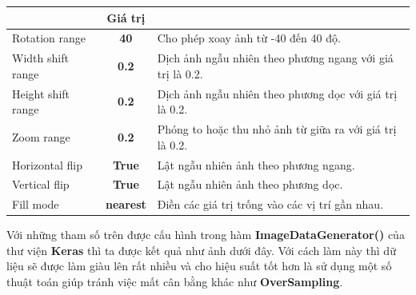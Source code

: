 \documentclass[12pt,a4paper]{article}
\begin{document}
	\begin{center}
		\begin{tabular}{|l|c|l|}
			\hline
			\rowcolor[HTML]{000000} 
			\multicolumn{1}{|c|}{\cellcolor[HTML]{000000}{\color[HTML]{FFFFFF} \textbf{Tham số}}} & {\color[HTML]{FFFFFF} \textbf{Giá trị}} & \multicolumn{1}{c|}{\cellcolor[HTML]{000000}{\color[HTML]{FFFFFF} \textbf{Mô tả}}} \\ \hline
			Rotation range                                                                        & \textbf{40}                            & Cho phép xoay ảnh từ -40 đến 40 độ.                                              \\ \hline
			Width shift range                                                                     & \textbf{0.2}                            & Dịch ảnh ngẫu nhiên theo phương ngang với giá trị là 0.2.                          \\ \hline
			Height shift range                                                                    & \textbf{0.2}                            & Dịch ảnh ngẫu nhiên theo phương dọc với giá trị là 0.2.                            \\ \hline
			Zoom range                                                                            & \textbf{0.2}                            & Phóng to hoặc thu nhỏ ảnh từ giữa ra với giá trị là 0.2.                           \\ \hline
			Horizontal flip                                                                       & \textbf{True}                           & Lật ngẫu nhiên ảnh theo phương ngang.                                              \\ \hline
			Vertical flip                                                                         & \textbf{True}                           & Lật ngẫu nhiên ảnh theo phương dọc.                                                \\ \hline
			Fill mode                                                                             & \textbf{nearest}                        & Điền các giá trị trống vào các vị trí gần nhau.                                    \\ \hline
		\end{tabular}
	\end{center}
	\noindent
	Với những tham số trên được cấu hình trong hàm \textbf{ImageDataGenerator()} của thư viện \textbf{Keras} thì ta được kết quả như ảnh dưới đây. Với cách làm này thì dữ liệu sẽ được làm giàu lên rất nhiều và cho hiệu suất tốt hơn là sử dụng một số thuật toán giúp tránh việc mất cân bằng khác như \textbf{OverSampling}.
\end{document}

